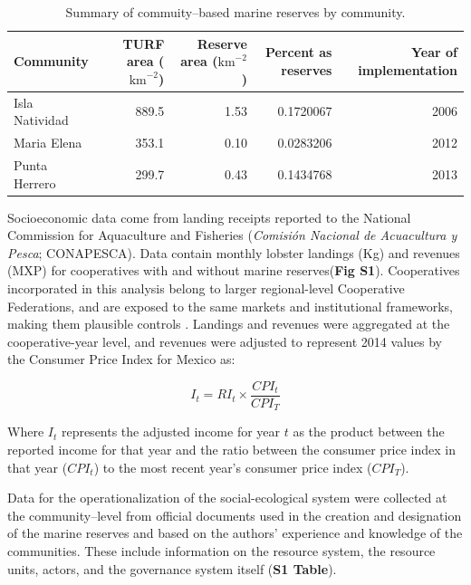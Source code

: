 \documentclass{frontiersSCNS}
\theoremstyle{definition}
\theoremstyle{definition}
\theoremstyle{definition}
\theoremstyle{remark}
\begin{document}
\clearpage

\begin{table}[H]

\caption{\label{tab:unnamed-chunk-2}\label{table:com_sum} Summary of commuity--based marine reserves by community.}
\centering
\begin{tabular}[t]{l|r|r|r|r}
\hline
Community & TURF area ($\mathrm{km}^{-2}$) & Reserve area ($\mathrm{km}^{-2}$) & Percent as reserves & Year of implementation\\
\hline
Isla Natividad & 889.5 & 1.53 & 0.1720067 & 2006\\
\hline
Maria Elena & 353.1 & 0.10 & 0.0283206 & 2012\\
\hline
Punta Herrero & 299.7 & 0.43 & 0.1434768 & 2013\\
\hline
\end{tabular}
\end{table}

Socioeconomic data come from landing receipts reported to the National
Commission for Aquaculture and Fisheries (\emph{Comisión Nacional de
Acuacultura y Pesca}; CONAPESCA). Data contain monthly lobster landings
(Kg) and revenues (MXP) for cooperatives with and without marine
reserves(\textbf{Fig S1}). Cooperatives incorporated in this analysis
belong to larger regional-level Cooperative Federations, and are exposed
to the same markets and institutional frameworks, making them plausible
controls \citep{mccay_2017-1m,ayer_2018}. Landings and revenues were
aggregated at the cooperative-year level, and revenues were adjusted to
represent 2014 values by the Consumer Price Index for Mexico
\citep{oecd_2017-VV} as:

\begin{equation}
I_t = RI_t\times\frac{CPI_t}{CPI_T}
\label{eqn:cpi}
\end{equation}

Where \(I_t\) represents the adjusted income for year \(t\) as the
product between the reported income for that year and the ratio between
the consumer price index in that year (\(CPI_t\)) to the most recent
year's consumer price index (\(CPI_T\)).

Data for the operationalization of the social-ecological system were
collected at the community--level from official documents used in the
creation and designation of the marine reserves
\citep{dof_website_2012,dof_website_2013,dof_website_2018} and based on
the authors' experience and knowledge of the communities. These include
information on the resource system, the resource units, actors, and the
governance system itself (\textbf{S1 Table}).
\end{document}
